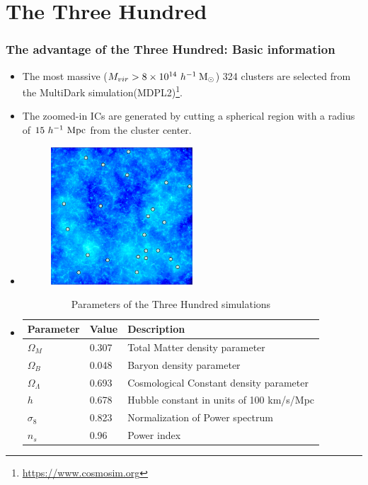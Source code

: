 \documentclass[aspectratio=43]{beamer}
\newcommand{\hMsun}{~h^{-1}\>{\rm M_\odot}}
\newcommand{\Mpc}{~h^{-1}~{\rm Mpc}}
\begin{document}
\section{The Three Hundred}
\begin{frame}
  \frametitle{The advantage of the Three Hundred: Basic information}
  \begin{itemize}
    \item<1-> {The most massive ($M_{vir} > 8\times 10^{14} \hMsun$) \alert{324} clusters are selected from the MultiDark simulation(MDPL2)\footnote{\url{https://www.cosmosim.org}}.}
    \item<1-> {The zoomed-in ICs are generated by cutting a spherical region with a radius of \alert{$15 \Mpc$} from the cluster center.}
    \item<2|only@2>[]{
      \begin{figure}
        \includegraphics[width=0.5\textwidth]{MDPL2}
      \end{figure}}
    \item<3|only@3>[]{
      \begin{table}
        \fontsize{10}{10}\selectfont
        \caption{Parameters of the Three Hundred simulations}
        \begin{tabular}{lll}
          \hline
          Parameter& Value & Description\\
          \hline
          $\Omega_M$ & 0.307 & Total Matter density parameter\\
          $\Omega_B$ & 0.048 & Baryon density parameter\\
          $\Omega_\Lambda$ & 0.693 & Cosmological Constant density parameter\\
          $h$ & 0.678  & Hubble constant in units of 100 km/s/Mpc\\
          $\sigma_8$ & 0.823 & Normalization of Power spectrum\\
          $n_s$ & 0.96  & Power index\\

\end{tabular}
\end{table}}
\end{itemize}
\end{frame}
\end{document}
